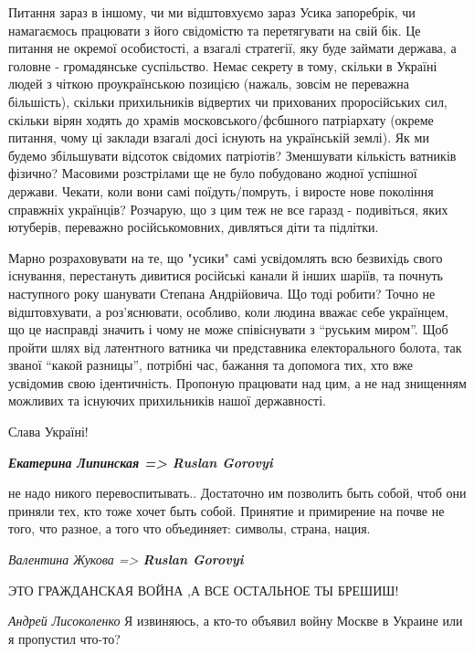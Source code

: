 Питання зараз в іншому, чи ми відштовхуємо зараз Усика запоребрік, чи
намагаємось працювати з його свідомістю та перетягувати на свій бік. Це питання
не окремої особистості, а взагалі стратегії, яку буде займати держава, а
головне - громадянське суспільство. Немає секрету в тому, скільки в Україні
людей з чіткою проукраїнською позицією (нажаль, зовсім не переважна більшість),
скільки прихильників відвертих чи прихованих проросійських сил, скільки вірян
ходять до храмів московського/фсбшного патріархату (окреме питання, чому ці
заклади взагалі досі існують на українській землі). Як ми будемо збільшувати
відсоток свідомих патріотів? Зменшувати кількість ватників фізично? Масовими
розстрілами ще не було побудовано жодної успішної держави. Чекати, коли вони
самі поїдуть/помруть, і виросте нове покоління справжніх українців? Розчарую,
що з цим теж не все гаразд - подивіться, яких ютуберів, переважно
російськомовних, дивляться діти та підлітки.

Марно розраховувати на те, що "усики" самі усвідомлять всю безвихідь свого
існування, перестануть дивитися російські канали й інших шаріїв, та почнуть
наступного року шанувати Степана Андрійовича. Що тоді робити? Точно не
відштовхувати, а роз’яснювати, особливо, коли людина вважає себе українцем, що
це насправді значить і чому не може співіснувати з \enquote{руським миром}. Щоб пройти
шлях від латентного ватника чи представника електорального болота, так званої
\enquote{какой разницы}, потрібні час, бажання та допомога тих, хто вже усвідомив свою
ідентичність. Пропоную працювати над цим, а не над знищенням можливих та
існуючих прихильників нашої державності. 

Слава Україні!

\begin{center}
\begin{fminipage}{0.9\textwidth}
\large\color{blue}\bfseries
{\em\color{orange} Екатерина Липинская => \textbf{Ruslan Gorovyi}}

не надо никого перевоспитывать.. Достаточно им позволить быть собой, чтоб они
приняли тех, кто тоже хочет быть собой. Принятие и примирение на почве не того,
что разное, а того что объединяет: символы, страна, нация.

{\em\color{orange} Валентина Жукова => \textbf{Ruslan Gorovyi}}

ЭТО ГРАЖДАНСКАЯ ВОЙНА ,А ВСЕ ОСТАЛЬНОЕ ТЫ БРЕШИШ!

{\em\color{orange} Андрей Лисоколенко}
Я извиняюсь, а кто-то объявил войну Москве в Украине или я пропустил что-то?

\end{fminipage}
\end{center}

